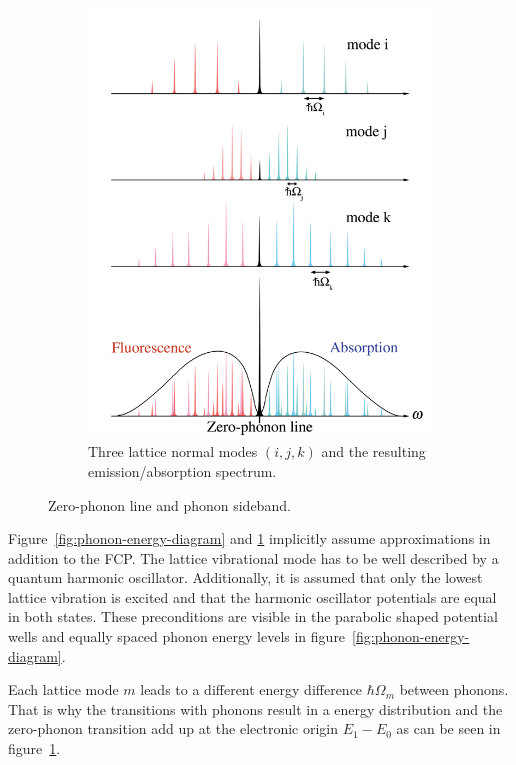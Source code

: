 \begin{figure}[H]
\begin{subfigure}[b]{0.48\textwidth}
		\includegraphics[width=\textwidth]{figures/quantum-dot/Lattice-modes}
		\caption{Three lattice normal modes $(i, j, k)$ and the resulting emission/absorption spectrum.\\}
		\label{fig:lattice-modes}
	\end{subfigure}
	\caption{Zero-phonon line and phonon sideband.~\cite{noauthor_zero-phonon_nodate}}
	\label{fig:zero-phonon-line-phonon-side-band}
\end{figure}

Figure~\ref{fig:phonon-energy-diagram} and \ref{fig:lattice-modes} implicitly assume approximations in addition to the \ac{FCP}.
The lattice vibrational mode has to be well described by a quantum harmonic oscillator.
Additionally, it is assumed that only the lowest lattice vibration is excited and that the harmonic oscillator potentials are equal in both states.
These preconditions are visible in the parabolic shaped potential wells and equally spaced phonon energy levels in figure~\ref{fig:phonon-energy-diagram}.

Each lattice mode $m$ leads to a different energy difference $\hbar \Omega_m$ between phonons.
That is why the transitions with phonons result in a energy distribution and the zero-phonon transition add up at the electronic origin $E_1 - E_0$ as can be seen in figure~\ref{fig:lattice-modes}.

